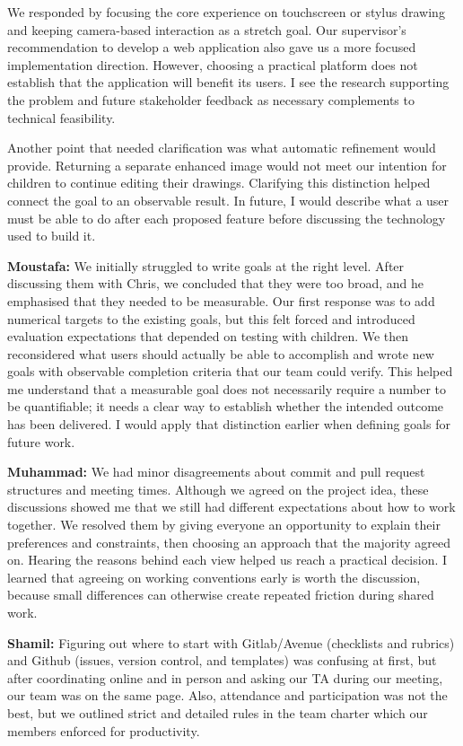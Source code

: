 \documentclass{article}
\begin{document}
\begin{enumerate}
We responded by focusing the core experience on touchscreen or stylus
drawing and keeping camera-based interaction as a stretch goal. Our
supervisor's recommendation to develop a web application also gave us a
more focused implementation direction. However, choosing a practical
platform does not establish that the application will benefit its users.
I see the research supporting the problem and future stakeholder feedback
as necessary complements to technical feasibility.

Another point that needed clarification was what automatic refinement
would provide. Returning a separate enhanced image would not meet our
intention for children to continue editing their drawings. Clarifying
this distinction helped connect the goal to an observable result.
In future, I would describe what a user must be able to do after each
proposed feature before discussing the technology used to build it.

\par\medskip
\textbf{Moustafa:} We initially struggled to write goals at the
right level. After discussing them with Chris, we concluded that they
were too broad, and he emphasised that they needed to be measurable.
Our first response was to add numerical targets to the existing goals,
but this felt forced and introduced evaluation expectations that depended
on testing with children. We then reconsidered what users should actually
be able to accomplish and wrote new goals with observable completion criteria
that our team could verify. This helped me understand that a measurable
goal does not necessarily require a number to be quantifiable; it needs a clear way to
establish whether the intended outcome has been delivered. I would apply
that distinction earlier when defining goals for future work.

\par\medskip
\textbf{Muhammad:} We had minor disagreements about commit and pull
request structures and meeting times. Although we agreed on the project idea,
these discussions showed me that we still had different expectations about
how to work together. We resolved them by giving everyone an opportunity to
explain their preferences and constraints, then choosing an approach that the
majority agreed on. Hearing the reasons behind each view helped us reach a
practical decision. I learned that agreeing on working conventions early is
worth the discussion, because small differences can otherwise create repeated
friction during shared work.

\par\medskip
\textbf{Shamil:} Figuring out where to start with Gitlab/Avenue (checklists 
and rubrics) and Github (issues, version control, and templates) was confusing 
at first, but after coordinating online and in person and asking our TA during 
our meeting, our team was on the same page. Also, attendance and participation 
was not the best, but we outlined strict and detailed rules in the team charter 
which our members enforced for productivity.


\end{enumerate}
\end{document}
